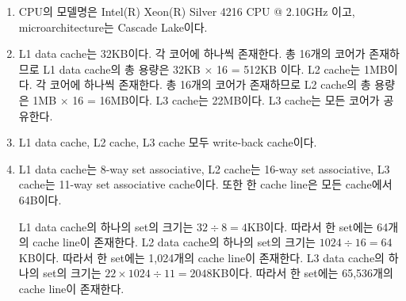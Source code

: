 \begin{enumerate}[label= (\alph*)]

    \item {
        CPU의 모델명은 Intel(R) Xeon(R) Silver 4216 CPU @ 2.10GHz 이고,
        microarchitecture는 Cascade Lake이다.
    }

    \item {
        L1 data cache는 32KB이다. 각 코어에 하나씩 존재한다.
        총 16개의 코어가 존재하므로 L1 data cache의 총 용량은 32KB $\times$ 16 = 512KB 이다.
        L2 cache는 1MB이다. 각 코어에 하나씩 존재한다.
        총 16개의 코어가 존재하므로 L2 cache의 총 용량은 1MB $\times$ 16 = 16MB이다.
        L3 cache는 22MB이다. L3 cache는 모든 코어가 공유한다\cite{CPUWorld,SpecOrg}.
    }

    \item {
        L1 data cache, L2 cache, L3 cache 모두 write-back cache이다\cite{WikiChip}.
    }

    \item {
        L1 data cache는 8-way set associative, L2 cache는 16-way set associative,
        L3 cache는 11-way set associative cache이다.
        또한 한 cache line은 모든 cache에서 64B이다\cite{CPUWorld,WikiChip}.
        
        L1 data cache의 하나의 set의 크기는 $32 \div 8 = 4$KB이다.
        따라서 한 set에는 64개의 cache line이 존재한다.
        L2 data cache의 하나의 set의 크기는 $1024 \div 16 = 64$KB이다.
        따라서 한 set에는 1,024개의 cache line이 존재한다.
        L3 data cache의 하나의 set의 크기는 $22 \times 1024 \div 11 = 2048$KB이다.
        따라서 한 set에는 65,536개의 cache line이 존재한다.
    }
    
\end{enumerate}